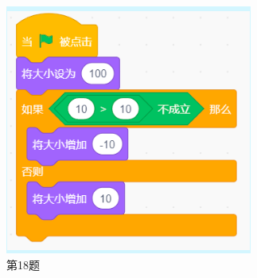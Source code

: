 \documentclass[10pt, a4paper]{article}
\begin{document}
\begin{enumerate}
\begin{figure}[htbp]
\begin{minipage}[t]{.2\textwidth}
                \includegraphics[width=\textwidth]{18.png}
                \caption*{第18题}
            \end{minipage}
            \begin{minipage}[t]{.18\textwidth}
                \centering

\end{minipage}
\end{figure}
\end{enumerate}
\end{document}
